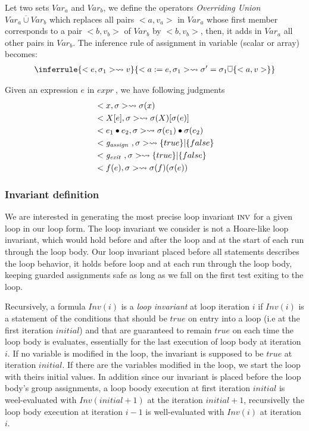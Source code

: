 \documentclass[a4paper,10pt]{article}
\newcommand{\idx}{\ensuremath{i}\xspace}
\newcommand{\idxinitial}{\ensuremath{\mathit{initial}}\xspace}
\newcommand{\gexit}{\ensuremath{\mathit{g_{exit}~}}}
\newcommand{\gassign}{\ensuremath{\mathit{g_{assign}~}}}
\newcommand{\expr}{\ensuremath{\mathit{expr~}}}
\newcommand{\Inv}[1]{\ensuremath{\mathit{Inv}(#1)\xspace}}
\newcommand{\inv}{\ensuremath{\textsc{inv}}\xspace}
\begin{document}
Let two sets $Var_a$ and $Var_b$, we define the operators \textit{Overriding Union} 
$Var_a \overline{\cup} Var_b$ which replaces all pairs $<a,v_a>$ in $Var_a$ whose 
first member corresponds to a pair $<b,v_b>$ of $Var_b$ by  $<b,v_b>$, then, 
it adds in $Var_a$ all other pairs in $Var_b$. 
The inference rule of assignment in variable (scalar or array) becomes:
\begin{eqnarray*}
&
\inferrule{
\eval{e}{\env_1} \rightsquigarrow v
}{
\eval{a:=e}{\env_1} \rightsquigarrow \env' = \env_1 \overline{\cup} \{<a,v>\}
}\\
\end{eqnarray*}

Given an expression $e$ in \expr, we have following judgments
\begin{eqnarray*}
 &\eval{x}{\env} \rightsquigarrow \env(x)\\
 &\eval{X[e]}{\env} \rightsquigarrow \env(X)[\env(e)]\\
 &\eval{e_1 \bullet e_2}{\env}  \rightsquigarrow \env(e_1) \bullet \env(e_2)\\
 &\eval{\gassign}{\env} \rightsquigarrow \{true\} | \{false\}\\
 &\eval{\gexit}{\env} \rightsquigarrow \{true\} | \{false\}\\
 &\eval{f(e)}{\env} \rightsquigarrow \env(f)(\env(e))\\
\end{eqnarray*}

\subsubsection*{Invariant definition}
We are interested in generating the most precise loop invariant \inv for
a given loop in our loop form. The loop invariant we consider is not a Hoare-like loop
invariant, which would hold before and after the loop and at the start of each
run through the loop body. Our loop invariant placed before all statements
describes the loop behavior, it holds before loop and at each run through the loop body, 
keeping guarded assignments safe as long as we fall on the first test exiting to the
loop. 

Recursively, a formula \Inv{\idx} is a \emph{loop invariant} at loop iteration \idx if \Inv{\idx}
is a statement of the conditions that should be $\mathit{true}$ on entry into a loop (i.e at the
first iteration \idxinitial) and that are guaranteed to remain $\mathit{true}$ on each time the 
loop body is evaluates, essentially for the last execution of loop body at iteration \idx. 
If no variable is modified in the loop, the invariant is supposed to be $\mathit{true}$ at iteration
\idxinitial. If there are the variables modified in the loop, we start the loop with theirs initial
values. In addition since our invariant is placed before the loop body's group assignments, a loop boody 
execution at first iteration $\idxinitial$ is weel-evaluated with $\Inv{\idxinitial+1}$ at the 
iteration $\idxinitial +1$, recursivelly the loop body execution at iteration $\idx-1$ is 
well-evaluated with $\Inv{\idx}$ at iteration $\idx$. 
\end{document}
